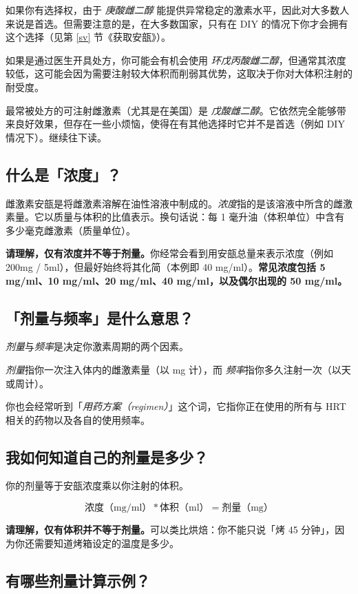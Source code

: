 \documentclass{article}
\begin{document}
如果你有选择权，由于 \textit{庚酸雌二醇} 能提供异常稳定的激素水平，因此对大多数人来说是首选。但需要注意的是，在大多数国家，只有在 DIY 的情况下你才会拥有这个选择（见第 \ref{sv} 节《获取安瓿》）。

如果是通过医生开具处方，你可能会有机会使用 \textit{环戊丙酸雌二醇}，但通常其浓度较低，这可能会因为需要注射较大体积而削弱其优势，这取决于你对大体积注射的耐受度。

最常被处方的可注射雌激素（尤其是在美国）是 \textit{戊酸雌二醇}。它依然完全能够带来良好效果，但存在一些小烦恼，使得在有其他选择时它并不是首选（例如 DIY 情况下）。继续往下读。

\subsection{什么是「浓度」？}

雌激素安瓿是将雌激素溶解在油性溶液中制成的。\textit{浓度}指的是该溶液中所含的雌激素量。它以质量与体积的比值表示。换句话说：每 1 毫升油（体积单位）中含有多少毫克雌激素（质量单位）。

\textbf{请理解，仅有浓度并不等于剂量。}你经常会看到用安瓿总量来表示浓度（例如 200mg / 5ml），但最好始终将其化简（本例即 40 mg/ml）。\textbf{常见浓度包括 5 mg/ml、10 mg/ml、20 mg/ml、40 mg/ml，以及偶尔出现的 50 mg/ml。}

\subsection{「剂量与频率」是什么意思？}

\textit{剂量}与\textit{频率}是决定你激素周期的两个因素。

\textit{剂量}指你一次注入体内的雌激素量（以 mg 计），而 \textit{频率}指你多久注射一次（以天或周计）。

你也会经常听到「\textit{用药方案（regimen）}」这个词，它指你正在使用的所有与 HRT 相关的药物以及各自的使用频率。

\subsection{我如何知道自己的剂量是多少？}

你的剂量等于安瓿浓度乘以你注射的体积。

\[
\text{浓度（mg/ml）} * \text{体积（ml）} = \text{剂量（mg）}
\]

\textbf{请理解，仅有体积并不等于剂量。}可以类比烘焙：你不能只说「烤 45 分钟」，因为你还需要知道烤箱设定的温度是多少。

\subsection{有哪些剂量计算示例？}
\end{document}
